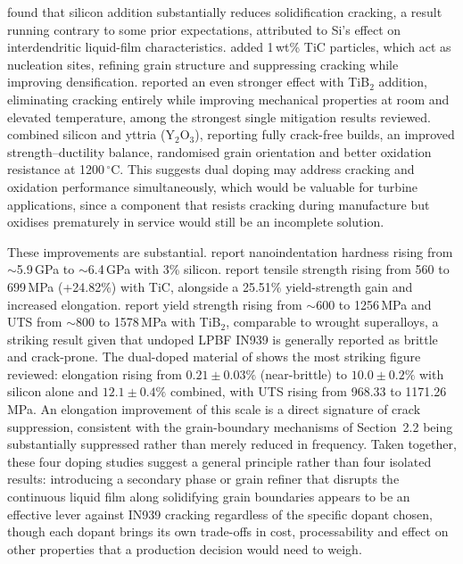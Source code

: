 \documentclass[a4paper]{article}
\begin{document}
\citet{zhang2023} found that silicon addition substantially reduces solidification cracking, a result running contrary to some prior expectations, attributed to Si's effect on interdendritic liquid-film characteristics. \citet{chen2026} added 1\,wt\% TiC particles, which act as nucleation sites, refining grain structure and suppressing cracking while improving densification. \citet{bae2025} reported an even stronger effect with TiB$_2$ addition, eliminating cracking entirely while improving mechanical properties at room and elevated temperature, among the strongest single mitigation results reviewed. \citet{ding2026} combined silicon and yttria (Y$_2$O$_3$), reporting fully crack-free builds, an improved strength--ductility balance, randomised grain orientation and better oxidation resistance at 1200\,$^\circ$C. This suggests dual doping may address cracking and oxidation performance simultaneously, which would be valuable for turbine applications, since a component that resists cracking during manufacture but oxidises prematurely in service would still be an incomplete solution.

These improvements are substantial. \citet{zhang2023} report nanoindentation hardness rising from $\sim$5.9\,GPa to $\sim$6.4\,GPa with 3\% silicon. \citet{chen2026} report tensile strength rising from 560 to 699\,MPa (+24.82\%) with TiC, alongside a 25.51\% yield-strength gain and increased elongation. \citet{bae2025} report yield strength rising from $\sim$600 to 1256\,MPa and UTS from $\sim$800 to 1578\,MPa with TiB$_2$, comparable to wrought superalloys, a striking result given that undoped LPBF IN939 is generally reported as brittle and crack-prone. The dual-doped material of \citet{ding2026} shows the most striking figure reviewed: elongation rising from $0.21\pm0.03\%$ (near-brittle) to $10.0\pm0.2\%$ with silicon alone and $12.1\pm0.4\%$ combined, with UTS rising from 968.33 to 1171.26\,MPa. An elongation improvement of this scale is a direct signature of crack suppression, consistent with the grain-boundary mechanisms of Section~2.2 being substantially suppressed rather than merely reduced in frequency. Taken together, these four doping studies suggest a general principle rather than four isolated results: introducing a secondary phase or grain refiner that disrupts the continuous liquid film along solidifying grain boundaries appears to be an effective lever against IN939 cracking regardless of the specific dopant chosen, though each dopant brings its own trade-offs in cost, processability and effect on other properties that a production decision would need to weigh.
\end{document}
